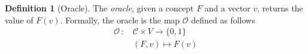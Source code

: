 \documentclass[a4paper,11pt]{article}
\theoremstyle{definition}
\newtheorem{defn}{Definition}
\begin{document}
\begin{defn}[Oracle]
  The \textit{oracle}, given a concept $F$ and a vector $v$, returns the value
  of $F(v)$. Formally, the oracle is the map $\mathcal{O}$ defined as follows
  \begin{equation}
    \begin{aligned}
      \mathcal{O}\,:\, &\mathcal{C}\times V \to \{0,1\}\\
      & \left( F,v \right) \mapsto F(v)
    \end{aligned}
    \label{oracle}
  \end{equation}
\end{defn}
\end{document}
